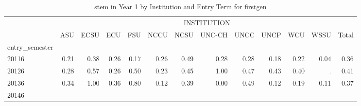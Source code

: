 \begin{table}[!h]
\caption{stem in Year 1 by Institution and Entry Term for firstgen}
\centering
\begin{tabular}{lllllllllllll}
\cline{1-13}
\multicolumn{1}{c}{} &
  \multicolumn{12}{|c}{INSTITUTION} \\
\multicolumn{1}{c}{} &
  \multicolumn{1}{|r}{ASU} &
  \multicolumn{1}{r}{ECSU} &
  \multicolumn{1}{r}{ECU} &
  \multicolumn{1}{r}{FSU} &
  \multicolumn{1}{r}{NCCU} &
  \multicolumn{1}{r}{NCSU} &
  \multicolumn{1}{r}{UNC-CH} &
  \multicolumn{1}{r}{UNCC} &
  \multicolumn{1}{r}{UNCP} &
  \multicolumn{1}{r}{WCU} &
  \multicolumn{1}{r}{WSSU} &
  \multicolumn{1}{r}{Total} \\
\cline{1-13}
\multicolumn{1}{l}{entry\_semester} &
  \multicolumn{1}{|r}{} &
  \multicolumn{1}{r}{} &
  \multicolumn{1}{r}{} &
  \multicolumn{1}{r}{} &
  \multicolumn{1}{r}{} &
  \multicolumn{1}{r}{} &
  \multicolumn{1}{r}{} &
  \multicolumn{1}{r}{} &
  \multicolumn{1}{r}{} &
  \multicolumn{1}{r}{} &
  \multicolumn{1}{r}{} &
  \multicolumn{1}{r}{} \\
\multicolumn{1}{l}{\hspace{1em}20116} &
  \multicolumn{1}{|r}{0.21} &
  \multicolumn{1}{r}{0.38} &
  \multicolumn{1}{r}{0.26} &
  \multicolumn{1}{r}{0.17} &
  \multicolumn{1}{r}{0.26} &
  \multicolumn{1}{r}{0.49} &
  \multicolumn{1}{r}{0.28} &
  \multicolumn{1}{r}{0.28} &
  \multicolumn{1}{r}{0.18} &
  \multicolumn{1}{r}{0.22} &
  \multicolumn{1}{r}{0.04} &
  \multicolumn{1}{r}{0.36} \\
\multicolumn{1}{l}{\hspace{1em}20126} &
  \multicolumn{1}{|r}{0.28} &
  \multicolumn{1}{r}{0.57} &
  \multicolumn{1}{r}{0.26} &
  \multicolumn{1}{r}{0.50} &
  \multicolumn{1}{r}{0.23} &
  \multicolumn{1}{r}{0.45} &
  \multicolumn{1}{r}{1.00} &
  \multicolumn{1}{r}{0.47} &
  \multicolumn{1}{r}{0.43} &
  \multicolumn{1}{r}{0.40} &
  \multicolumn{1}{r}{.} &
  \multicolumn{1}{r}{0.41} \\
\multicolumn{1}{l}{\hspace{1em}20136} &
  \multicolumn{1}{|r}{0.34} &
  \multicolumn{1}{r}{1.00} &
  \multicolumn{1}{r}{0.36} &
  \multicolumn{1}{r}{0.80} &
  \multicolumn{1}{r}{0.12} &
  \multicolumn{1}{r}{0.39} &
  \multicolumn{1}{r}{0.00} &
  \multicolumn{1}{r}{0.49} &
  \multicolumn{1}{r}{0.12} &
  \multicolumn{1}{r}{0.19} &
  \multicolumn{1}{r}{0.11} &
  \multicolumn{1}{r}{0.37} \\
\multicolumn{1}{l}{\hspace{1em}20146} &

\end{tabular}
\end{table}
